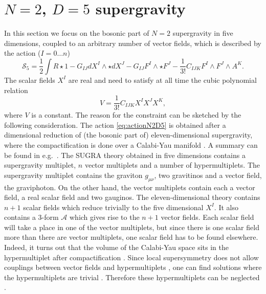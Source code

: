 \documentclass[12pt,twoside]{book}
\begin{document}
\section{$N=2$, $D=5$ supergravity}\label{N2D5Sugra}

In this section we focus on the bosonic part of $N=2$ supergravity in five dimensions, coupled to an arbitrary number of vector fields, which is described by the action ($I = 0\ldots n$)
\begin{equation}\label{eq:actionN2D5}
\mathcal{S}_{5} = \frac{1}{2} \int R\star 1 - G_{IJ}dX^{I}\wedge\star dX^{J} - G_{IJ}F^{I}\wedge\star F^{J}-\frac{1}{3!}
C_{IJK}F^{I}\wedge F^{J}\wedge A^{K}.
\end{equation}
The scalar fields $X^{I}$ are real and need to satisfy at all time the cubic polynomial relation
\begin{equation}\label{vol-CY}
V = \frac{1}{3!}C_{IJK}X^{I}X^{J}X^{K},
\end{equation}
where $V$ is a constant. The reason for the constraint can be sketched by the following consideration. The action \eqref{eq:actionN2D5} is obtained after a dimensional reduction of (the bosonic part of) eleven-dimensional supergravity, where the compactification is done over a Calabi-Yau manifold \cite{Cadavid:fk}. A summary can be found in e.g.\ \cite{Castro:2008fk}. The SUGRA theory obtained in five dimensions contains a supergravity multiplet, $n$ vector multiplets and a number of hypermultiplets. The supergravity multiplet contains the graviton $g_{\mu\nu}$, two gravitinos and a vector field, the graviphoton. On the other hand, the vector multiplets contain each a vector field, a real scalar field and two gauginos. The eleven-dimensional theory contains $n+1$ scalar fields which reduce trivially to the five dimensional $X^{I}$. It also contains a 3-form $\mathcal{A}$ which gives rise to the $n+1$ vector fields. Each scalar field will take a place in one of the vector multiplets, but since there is one scalar field more than there are vector multiplets, one scalar field has to be found elsewhere. Indeed, it turns out that the volume of the Calabi-Yau space sits in the hypermultiplet after compactification \cite{Cadavid:fk}.
Since local supersymmetry does not allow couplings between vector fields and hypermultiplets \cite{deWit:1985}, one can find solutions where the hypermultiplets are trivial \cite{Mohaupt:2001kx}. Therefore these hypermultiplets can be neglected \cite{Castro:2008fk,Pioline:uq}.
\end{document}
